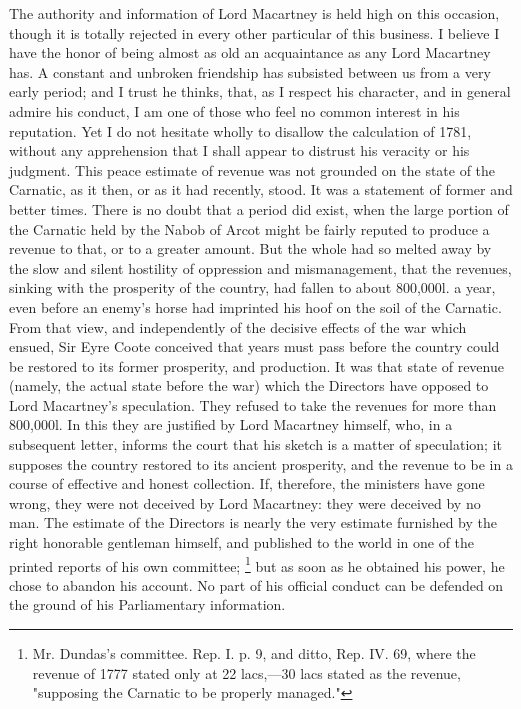 The authority and information of Lord Macartney is held high on this occasion, though it is totally rejected in every other particular of this business. I believe I have the honor of being almost as old an acquaintance as any Lord Macartney has. A constant and unbroken friendship has subsisted between us from a very early period; and I trust he thinks, that, as I respect his character, and in general admire his conduct, I am one of those who feel no common interest in his reputation. Yet I do not hesitate wholly to disallow the calculation of 1781, without any apprehension that I shall appear to distrust his veracity or his judgment. This peace estimate of revenue was not grounded on the state of the Carnatic, as it then, or as it had recently, stood. It was a statement of former and better times. There is no doubt that a period did exist, when the large portion of the Carnatic held by the Nabob of Arcot might be fairly reputed to produce a revenue to that, or to a greater amount. But the whole had so melted away by the slow and silent hostility of oppression and mismanagement, that the revenues, sinking with the prosperity of the country, had fallen to about 800,000l. a year, even before an enemy's horse had imprinted his hoof on the soil of the Carnatic. From that view, and independently of the decisive effects of the war which ensued, Sir Eyre Coote conceived that years must pass before the country could be restored to its former prosperity, and production. It was that state of revenue (namely, the actual state before the war) which the Directors have opposed to Lord Macartney's speculation. They refused to take the revenues for more than 800,000l. In this they are justified by Lord Macartney himself, who, in a subsequent letter, informs the court that his sketch is a matter of speculation; it supposes the country restored to its ancient prosperity, and the revenue to be in a course of effective and honest collection. If, therefore, the ministers have gone wrong, they were not deceived by Lord Macartney: they were deceived by no man. The estimate of the Directors is nearly the very estimate furnished by the right honorable gentleman himself, and published to the world in one of the printed reports of his own committee;
\footnote{ Mr. Dundas's committee. Rep. I. p. 9, and ditto, Rep. IV. 69, where the revenue of 1777 stated only at 22 lacs,—30 lacs stated as the revenue, "supposing the Carnatic to be properly managed."}
 but as soon as he obtained his power, he chose to abandon his account. No part of his official conduct can be defended on the ground of his Parliamentary information.

